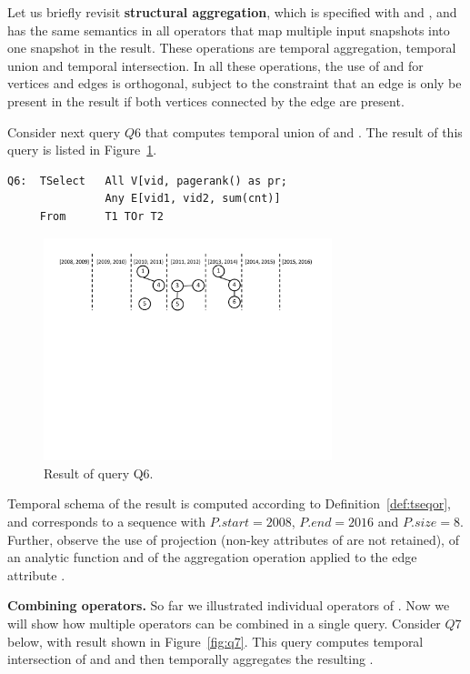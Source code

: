 Let us briefly revisit {\bf structural aggregation}, which is
specified with  and , and has the same semantics
in all \ql operators that map multiple input snapshots into one
snapshot in the result. These operations are temporal aggregation,
temporal union and temporal intersection.  In all these operations,
the use of  and  for vertices and edges is
orthogonal, subject to the constraint that an edge is only be present
in the result if both vertices connected by the edge are present.

Consider next query $Q6$ that computes temporal union of 
and .  The result of this query is listed in
Figure~\ref{fig:q6}.

\begin{verbatim}
Q6:  TSelect   All V[vid, pagerank() as pr; 
               Any E[vid1, vid2, sum(cnt)]
     From      T1 TOr T2
\end{verbatim}

\begin{figure}
\centering
\includegraphics[width=3.3in]{figs/q6.pdf}
\caption{Result of query Q6.}
\label{fig:q6}
\end{figure}

Temporal schema of the result is computed according to
Definition~\ref{def:tseqor}, and corresponds to a sequence with
$P.start = 2008$, $P.end=2016$ and $P.size=8$.  Further, observe the
use of projection (non-key attributes of  are not retained),
of an analytic function  and of the aggregation
operation  applied to the edge attribute .

{\bf Combining operators.}  So far we illustrated individual operators
of \ql.  Now we will show how multiple operators can be combined in a
single query.  Consider $Q7$ below, with result shown in
Figure~\ref{fig:q7}. This query computes temporal intersection of
 and  and then temporally aggregates the resulting
\tg.

